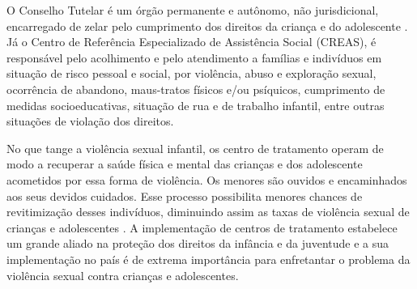 O Conselho Tutelar é um órgão permanente e autônomo, não jurisdicional, encarregado de zelar pelo cumprimento dos direitos da criança e do adolescente \cite{saude2002notificacao}. Já o Centro de Referência Especializado de Assistência Social (CREAS), é responsável pelo acolhimento e pelo atendimento a famílias e indivíduos em situação de risco pessoal e social, por violência, abuso e exploração sexual, ocorrência de abandono, maus-tratos físicos e/ou psíquicos, cumprimento de medidas socioeducativas, situação de rua e de trabalho infantil, entre outras situações de violação dos direitos.

No que tange a violência sexual infantil, os centro de tratamento operam de modo a recuperar a saúde física e mental das crianças e dos adolescente acometidos por essa forma de violência. Os menores são ouvidos e encaminhados aos seus devidos cuidados. Esse processo possibilita menores chances de revitimização desses indivíduos, diminuindo assim as taxas de violência sexual de crianças e adolescentes \cite{faraj2016atendimento}. A implementação de centros de tratamento estabelece um grande aliado na proteção dos direitos da infância e da juventude e a sua implementação no país é de extrema importância para enfretantar o problema da violência sexual contra crianças e adolescentes. %



